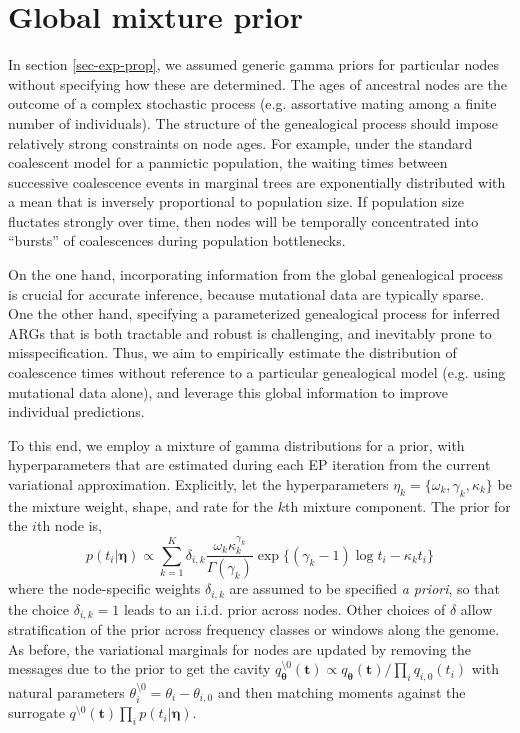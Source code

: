 \documentclass{article}
\begin{document}
\section{Global mixture prior}

In section \ref{sec-exp-prop}, we assumed generic gamma priors for particular nodes without specifying how these are determined.
The ages of ancestral nodes are the outcome of a complex stochastic process (e.g. assortative mating among a finite number of individuals). The structure of the genealogical process should impose relatively strong constraints on node ages. For example, under the standard coalescent model for a panmictic population, the waiting times between successive coalescence events in marginal trees are exponentially distributed with a mean that is inversely proportional to population size. If population size fluctates strongly over time, then nodes will be temporally concentrated into ``bursts'' of coalescences during population bottlenecks.

On the one hand, incorporating information from the global genealogical process is crucial for accurate inference, because mutational data are typically sparse. One the other hand, specifying a parameterized genealogical process for inferred ARGs that is both tractable and robust is challenging, and inevitably prone to misspecification. Thus, we aim to empirically estimate the distribution of coalescence times without reference to a particular genealogical model (e.g. using mutational data alone), and leverage this global information to improve individual predictions. 

To this end, we employ a mixture of gamma distributions for a prior, with hyperparameters that are estimated during each EP iteration from the current variational approximation. Explicitly, let the hyperparameters $\eta_k = \{ \omega_k, \gamma_k, \kappa_k \}$ be the mixture weight, shape, and rate for the $k$th mixture component. The prior for the $i$th node is,
\[
  p(t_i | \bm \eta) \propto \sum_{k=1}^K \delta_{i,k} \frac{\omega_k \kappa_k^{\gamma_k}}{\Gamma(\gamma_k)} \exp \{(\gamma_k - 1) \log t_i - \kappa_k t_i \}
\]
where the node-specific weights $\delta_{i,k}$ are assumed to be specified \emph{a priori}, so that the choice $\delta_{i,k} = 1$ leads to an i.i.d. prior across nodes. Other choices of $\delta$ allow stratification of the prior across frequency classes or windows along the genome. As before, the variational marginals for nodes are updated by removing the messages due to the prior to get the cavity $q_{\bm \theta}^{\setminus 0}(\bm t) \propto q_{\bm \theta}(\bm t) / \prod_{i} q_{i,0}(t_i)$ with natural parameters $\theta_i^{\setminus 0} = \theta_i - \theta_{i,0}$ and then matching moments against the surrogate $q^{\setminus 0}(\bm t) \prod_{i} p(t_i | \bm \eta)$. 
\end{document}
